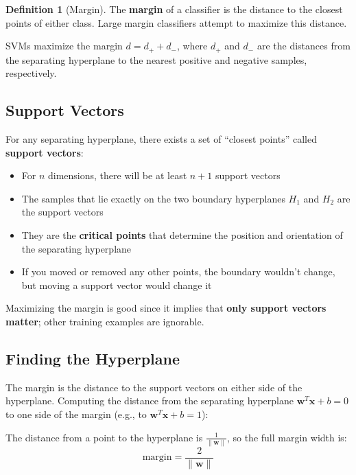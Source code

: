 \documentclass[11pt,a4paper]{article}
\theoremstyle{definition}
\newtheorem{definition}{Definition}[section]
\theoremstyle{plain}
\theoremstyle{remark}
\begin{document}
\begin{definition}[Margin]
The \textbf{margin} of a classifier is the distance to the closest points of either class. Large margin classifiers attempt to maximize this distance.
\end{definition}

SVMs maximize the margin $d = d_+ + d_-$, where $d_+$ and $d_-$ are the distances from the separating hyperplane to the nearest positive and negative samples, respectively.

\subsection{Support Vectors}

\begin{tcolorbox}[colback=green!5!white,colframe=green!75!black,title=\textbf{Support Vectors}]
For any separating hyperplane, there exists a set of ``closest points'' called \textbf{support vectors}:
\begin{itemize}
    \item For $n$ dimensions, there will be at least $n + 1$ support vectors
    \item The samples that lie exactly on the two boundary hyperplanes $H_1$ and $H_2$ are the support vectors
    \item They are the \textbf{critical points} that determine the position and orientation of the separating hyperplane
    \item If you moved or removed any other points, the boundary wouldn't change, but moving a support vector would change it
\end{itemize}
\end{tcolorbox}

Maximizing the margin is good since it implies that \textbf{only support vectors matter}; other training examples are ignorable.

\subsection{Finding the Hyperplane}

The margin is the distance to the support vectors on either side of the hyperplane. Computing the distance from the separating hyperplane $\mathbf{w}^T \mathbf{x} + b = 0$ to one side of the margin (e.g., to $\mathbf{w}^T \mathbf{x} + b = 1$):

The distance from a point to the hyperplane is $\frac{1}{\|\mathbf{w}\|}$, so the full margin width is:
\[
\text{margin} = \frac{2}{\|\mathbf{w}\|}
\]
\end{document}
